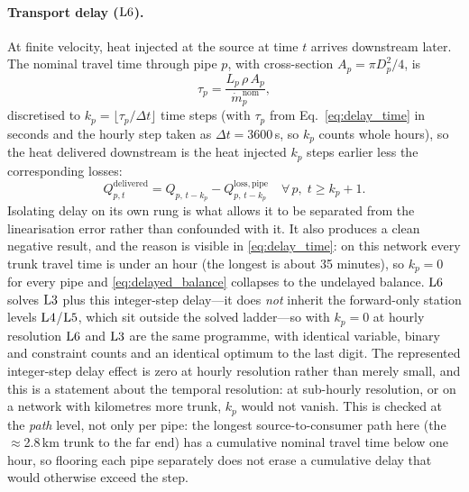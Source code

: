 \paragraph{Transport delay ($\mathrm{L6}$).}
At finite velocity, heat injected at the source at time $t$ arrives downstream later. The
nominal travel time through pipe $p$, with cross-section $A_p = \pi D_p^2/4$, is
%
\begin{equation}
  \tau_p = \frac{L_p\, \rho\, A_p}{\dot{m}_p^{\mathrm{nom}}},
  \label{eq:delay_time}
\end{equation}
%
discretised to $k_p = \lfloor \tau_p/\Delta t \rfloor$ time steps (with $\tau_p$ from
Eq.~\eqref{eq:delay_time} in seconds and the hourly step taken as $\Delta t = 3600$\,s, so
$k_p$ counts whole hours), so the heat delivered downstream is the heat injected $k_p$ steps
earlier less the corresponding losses:
%
\begin{equation}
  Q_{p,t}^{\mathrm{delivered}} =
    Q_{p,\,t-k_p} - Q_{p,\,t-k_p}^{\mathrm{loss,pipe}}
  \quad \forall\, p,\; t \geq k_p{+}1.
  \label{eq:delayed_balance}
\end{equation}
%
Isolating delay on its own rung is what allows it to be separated from the linearisation
error rather than confounded with it. It also produces a clean negative
result, and the reason is visible in \eqref{eq:delay_time}: on this network every trunk
travel time is under an hour (the longest is about 35 minutes), so $k_p = 0$ for every
pipe and \eqref{eq:delayed_balance} collapses to the undelayed balance. $\mathrm{L6}$ solves
$\mathrm{L3}$ plus this integer-step delay---it does \emph{not} inherit the forward-only station
levels $\mathrm{L4}$/$\mathrm{L5}$, which sit outside the solved ladder---so with $k_p=0$ at hourly
resolution $\mathrm{L6}$ and $\mathrm{L3}$ are the same programme, with identical variable, binary and
constraint counts and an identical optimum to the last digit. The represented integer-step
delay effect is zero at hourly resolution rather than merely small, and this is a statement about
the temporal resolution: at sub-hourly resolution, or on a network with kilometres more trunk,
$k_p$ would not vanish. This is checked at the \emph{path} level, not only per pipe: the longest
source-to-consumer path here (the $\approx$2.8\,km trunk to the far end) has a cumulative
nominal travel time below one hour, so flooring each pipe separately does not erase a cumulative
delay that would otherwise exceed the step.
